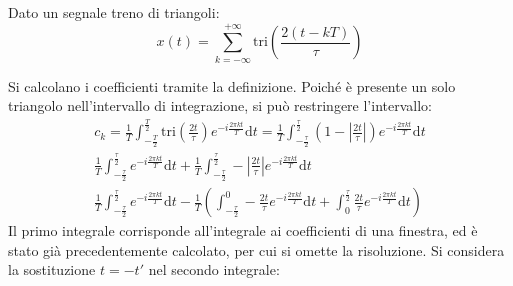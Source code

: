 \documentclass{article}
\newcommand{\tri}{\mathrm{tri}}
\newcommand{\df}{\mathrm{d}}
\begin{document}
Dato un segnale treno di triangoli:
\begin{equation*}
    x(t)=\displaystyle\sum_{k=-\infty}^{+\infty}\tri \left(\frac{2(t-kT)}{\tau}\right)
\end{equation*}
\begin{center}
\end{center}
Si calcolano i coefficienti tramite la definizione. Poiché è presente un solo triangolo nell'intervallo di integrazione, si può restringere l'intervallo: 
\begin{gather*}
    c_k=\displaystyle\frac{1}{T}\int_{-\frac{T}{2}}^{\frac{T}{2}}\tri \left(\frac{2t}{\tau}\right)e^{-i\frac{2\pi kt}{T}}\df t=\frac{1}{T}\int_{-\frac{\tau}{2}}^{\frac{\tau}{2}}\left(1-\left|\frac{2t}{\tau}\right|\right)e^{-i\frac{2\pi kt}{T}}\df t\\
    \displaystyle\frac{1}{T}\int_{-\frac{\tau}{2}}^{\frac{\tau}{2}}e^{-i\frac{2\pi kt}{T}}\df t+\frac{1}{T}\int_{-\frac{\tau}{2}}^{\frac{\tau}{2}}-\left|\frac{2t}{\tau}\right|e^{-i\frac{2\pi kt}{T}}\df t\\
    \displaystyle\frac{1}{T}\int_{-\frac{\tau}{2}}^{\frac{\tau}{2}}e^{-i\frac{2\pi kt}{T}}\df t-\frac{1}{T}\left(\int_{-\frac{\tau}{2}}^{0}-\frac{2t}{\tau}e^{-i\frac{2\pi kt}{T}}\df t+\int_{0}^{\frac{\tau}{2}}\frac{2t}{\tau}e^{-i\frac{2\pi kt}{T}}\df t\right)
\end{gather*}
Il primo integrale corrisponde all'integrale ai coefficienti di una finestra, ed è stato già precedentemente calcolato, per cui si omette la risoluzione. Si considera la 
sostituzione $t=-t'$ nel secondo integrale:
\end{document}
